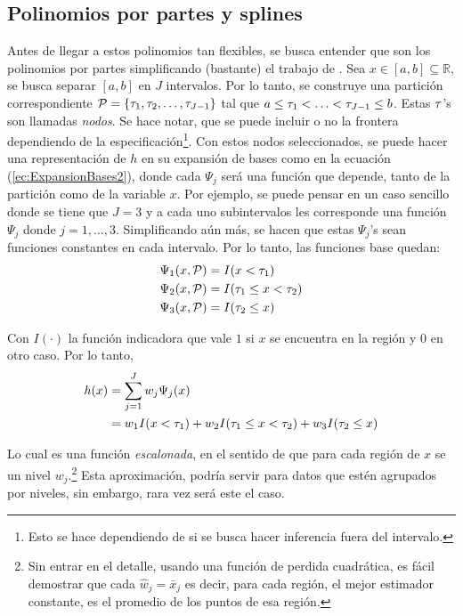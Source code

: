 \documentclass[../Main/Main.tex]{subfiles}
\begin{document}
\subsection{Polinomios por partes y splines} \label{sec:PolisYSplines}
Antes de llegar a estos polinomios tan flexibles, se busca entender que son los polinomios por partes simplificando (bastante) el trabajo de \autocite{wahba1990splines}. Sea $x\in[a,b]\subseteq\mathbb{R}$, se busca separar $[a,b]$ en $J$ intervalos. Por lo tanto, se construye una partición correspondiente $\mathcal{P} = \left\{\tau_1,  \tau_2,\ldots,  \tau_{J-1} \right\}$ tal que $a \leq  \tau_1 < \ldots <  \tau_{J-1} \leq b$. Estas $ \tau$'s son llamadas \textit{nodos}. Se hace notar, que se puede incluir o no la frontera dependiendo de la especificación\footnote{Esto se hace dependiendo de si se busca hacer inferencia fuera del intervalo.}. Con estos nodos seleccionados, se puede hacer una representación de $h$ en su expansión de bases como en la ecuación (\ref{ec:ExpansionBases2}), donde cada $\Psi_j$ será una función que depende, tanto de la partición como de la variable $x$. Por ejemplo, se puede pensar en un caso sencillo donde se tiene que $J = 3$ y a cada uno subintervalos les corresponde una función $\Psi_j$ donde $j = 1,\ldots,3$. Simplificando aún más, se hacen que estas $\Psi_j$'s sean funciones constantes en cada intervalo. Por lo tanto, las funciones base quedan:
\begin{align*}
	\Psi_1(x,\mathcal{P}) &= I( x <  \tau_1) \\
	\Psi_2(x,\mathcal{P}) &= I( \tau_1 \leq x <  \tau_2) \\
	\Psi_3(x,\mathcal{P}) &= I( \tau_2 \leq x ) 
\end{align*}

Con $I(\cdot)$ la función indicadora que vale $1$ si $x$ se encuentra en la región y $0$ en otro caso. Por lo tanto, 
\begin{align*}
		h(x) &= \sum_{j = 1}^J w_j\Psi_j(x) \\
			 &= w_1 I( x <  \tau_1) + w_2 I( \tau_1 \leq x <  \tau_2) + w_3 I( \tau_2 \leq x)
\end{align*}

Lo cual es una función \textit{escalonada}, en el sentido de que para cada región de $x$ se un nivel $w_j$.\footnote{Sin entrar en el detalle, usando una función de perdida cuadrática, es fácil demostrar que cada $\hat{w}_j = \bar{x}_j$ es decir, para cada región, el mejor estimador constante, es el promedio de los puntos de esa región.} Esta aproximación, podría servir para datos que estén agrupados por niveles, sin embargo, rara vez será este el caso.\\
\end{document}
